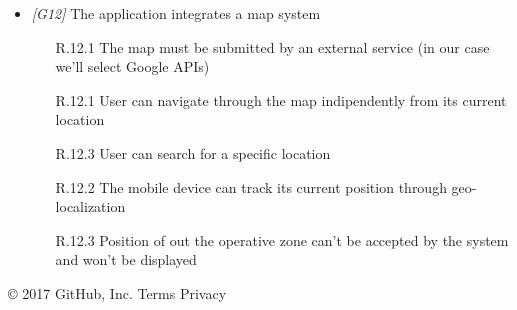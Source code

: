 \begin{itemize}
\item \textit{[G12]} The application integrates a map system
                   
                  \begin{itemize}
                        \item [R.12.1] The map must be submitted by an external service (in our case we'll select Google APIs)
                        \item [R.12.1] User can navigate through the map indipendently from its current location
                        \item [R.12.3] User can search for a specific location
                        \item [R.12.2] The mobile device can track its current position through geo-localization
                        \item [R.12.3] Position of out the operative zone can't be accepted by the system and won't be displayed
                   \end{itemize}


            \end{itemize}



\vfill
© 2017 GitHub, Inc.
Terms
Privacy